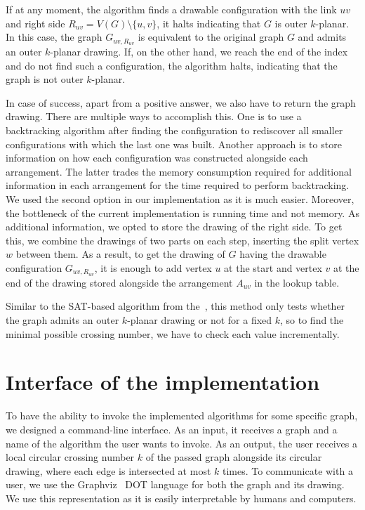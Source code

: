 If at any moment, the algorithm finds a drawable configuration with the link \(uv\) and right side \(R_{uv} = V(G)\setminus\{u, v\}\), it halts indicating that \(G\) is outer \(k\)-planar. In this case, the graph \(G_{uv, R_{uv}}\) is equivalent to the original graph \(G\) and admits an outer \(k\)-planar drawing. If, on the other hand, we reach the end of the index and do not find such a configuration, the algorithm halts, indicating that the graph is not outer \(k\)-planar.

In case of success, apart from a positive answer, we also have to return the graph drawing. There are multiple ways to accomplish this. One is to use a backtracking algorithm after finding the configuration to rediscover all smaller configurations with which the last one was built. Another approach is to store information on how each configuration was constructed alongside each arrangement. The latter trades the memory consumption required for additional information in each arrangement for the time required to perform backtracking. We used the second option in our implementation as it is much easier. Moreover, the bottleneck of the current implementation is running time and not memory. As additional information, we opted to store the drawing of the right side. To get this, we combine the drawings of two parts on each step, inserting the split vertex \(w\) between them. As a result, to get the drawing of \(G\) having the drawable configuration \(G_{uv, R_{uv}}\), it is enough to add vertex \(u\) at the start and vertex \(v\) at the end of the drawing stored alongside the arrangement \(A_{uv}\) in the lookup table.

Similar to the SAT-based algorithm from the~, this method only tests whether the graph admits an outer \(k\)-planar drawing or not for a fixed \(k\), so to find the minimal possible crossing number, we have to check each value incrementally.


\section{Interface of the implementation}

To have the ability to invoke the implemented algorithms for some specific graph, we designed a command-line interface. As an input, it receives a graph and a name of the algorithm the user wants to invoke. As an output, the user receives a local circular crossing number \(k\) of the passed graph alongside its circular drawing, where each edge is intersected at most \(k\) times. To communicate with a user, we use the Graphviz~\cite{graphviz} \textsc{DOT} language for both the graph and its drawing. We use this representation as it is easily interpretable by humans and computers.

